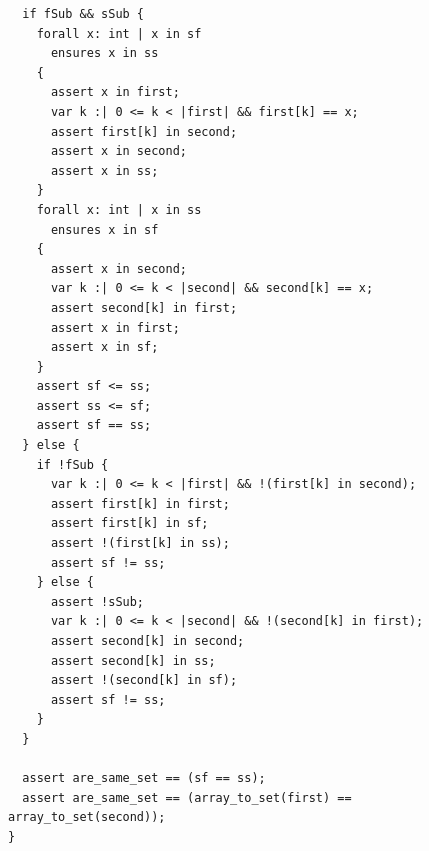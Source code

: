 \documentclass{article}
\begin{document}
\begin{lstlisting}
  if fSub && sSub {
    forall x: int | x in sf
      ensures x in ss
    {
      assert x in first;
      var k :| 0 <= k < |first| && first[k] == x;
      assert first[k] in second;
      assert x in second;
      assert x in ss;
    }
    forall x: int | x in ss
      ensures x in sf
    {
      assert x in second;
      var k :| 0 <= k < |second| && second[k] == x;
      assert second[k] in first;
      assert x in first;
      assert x in sf;
    }
    assert sf <= ss;
    assert ss <= sf;
    assert sf == ss;
  } else {
    if !fSub {
      var k :| 0 <= k < |first| && !(first[k] in second);
      assert first[k] in first;
      assert first[k] in sf;
      assert !(first[k] in ss);
      assert sf != ss;
    } else {
      assert !sSub;
      var k :| 0 <= k < |second| && !(second[k] in first);
      assert second[k] in second;
      assert second[k] in ss;
      assert !(second[k] in sf);
      assert sf != ss;
    }
  }

  assert are_same_set == (sf == ss);
  assert are_same_set == (array_to_set(first) == array_to_set(second));
}
\end{lstlisting}
\end{document}
